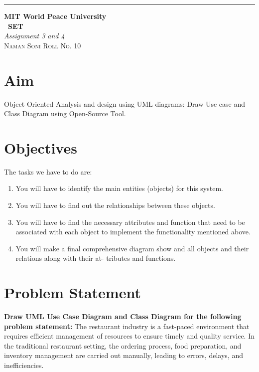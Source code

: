 \documentclass{article}
\begin{document}
\begin{titlepage} %
	
	\raggedleft\rule{1pt}{\textheight} %
	\hspace{0.05\textwidth} %
	\parbox[b]{0.75\textwidth}
	{ %
		
		{\Huge\bfseries MIT World Peace University \\[0.5\baselineskip] \ SET}\\[2\baselineskip] %
		{\large\textit{Assignment 3 and 4}}\\[4\baselineskip] %
		{\Large\textsc{Naman Soni Roll No. 10}} %
		
		\vspace{0.5\textheight} %
	}
	
\end{titlepage}
\tableofcontents
\pagebreak
\section{\textbf{Aim}}
Object Oriented Analysis and design using UML diagrams: Draw Use case and Class Diagram using Open-Source Tool.
\section{\textbf{Objectives}}
The tasks we have to do are:
\begin{enumerate}
	\item You will have to identify the main entities (objects) for this system.
	\item You will have to find out the relationships between these objects.
	\item You will have to find the necessary attributes and function that need to be associated with each object to implement the functionality mentioned above.
	\item You will make a final comprehensive diagram show and all objects and their relations along with their at- tributes and functions.
\end{enumerate}
\section{\textbf{Problem Statement}}
\textbf{Draw UML Use Case Diagram and Class Diagram for the following problem statement:} The restaurant industry is a fast-paced environment that requires efficient management of resources to ensure timely and quality service. In the traditional restaurant setting, the ordering process, food preparation, and inventory management are carried out manually, leading to errors, delays, and inefficiencies.
\end{document}
